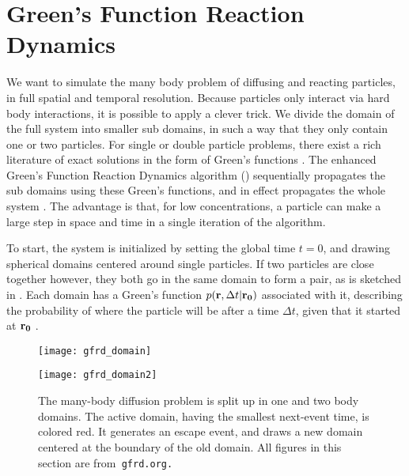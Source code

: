 \section{Green's Function Reaction Dynamics}

We want to simulate the many body problem of diffusing and reacting particles, in full spatial and temporal resolution. Because particles only interact via hard body interactions, it is possible to apply a clever trick. We divide the domain of the full system into smaller sub domains, in such a way that they only contain one or two particles. For single or double particle problems, there exist a rich literature of exact solutions in the form of Green's functions \cite{Carslaw1959}\cite{Beck1992}. The enhanced Green's Function Reaction Dynamics algorithm (\GFRD) sequentially propagates the sub domains using these Green's functions, and in effect propagates the whole system \cite{VanZon2005,VanZon2006,Takahashi2010,Bossen2011a}. The advantage is that, for low concentrations, a particle can make a large step in space and time in a single iteration of the algorithm.


To start, the system is initialized by setting the global time $t=0$, and drawing spherical domains centered around single particles. If two particles are close together however, they both go in the same domain to form a pair, as is sketched in . Each domain has a Green's function $p({\bf r}, \Delta t|{\bf r_0})$ associated with it, describing the probability of where the particle will be after a time $\Delta t$, given that it started at ${\bf r_0}$ \cite{Carslaw1959}. 

\begin{figure}[ht]
\begin{minipage}[ht]{.5\linewidth}
\centering
\texttt{[image: gfrd\_domain]}
\end{minipage}
\begin{minipage}[ht]{.5\linewidth}
\centering
\texttt{[image: gfrd\_domain2]}
\end{minipage}
\caption{ The many-body diffusion problem is split up in one and two body domains. The active domain, having the smallest next-event time, is colored red. It generates an escape event, and draws a new domain centered at the boundary of the old domain. All figures in this section are from\tt{ gfrd.org}.}
\end{figure}

